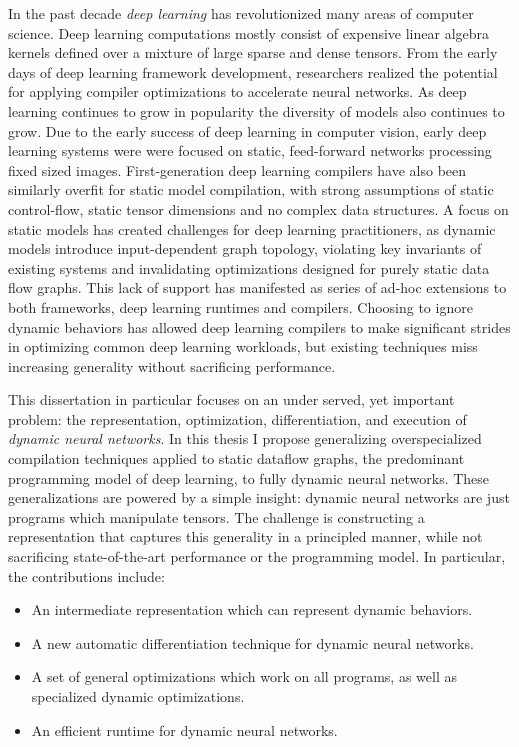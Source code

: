 \begin{fullwidth}
\begin{center}
\begin{flushleft}
In the past decade \emph{deep learning} has revolutionized many areas of
    computer science.
Deep learning computations mostly consist
    of expensive linear algebra kernels defined over a mixture
    of large sparse and dense tensors.
From the early days of deep learning framework development, researchers realized the
    potential for applying compiler optimizations to accelerate neural networks.
As deep learning continues to grow in popularity the diversity
    of models also continues to grow.
Due to the early success of deep learning in computer
    vision, early deep learning systems were were focused on static,
    feed-forward networks processing fixed sized images.
First-generation deep learning compilers have also been similarly overfit
    for static model compilation, with strong assumptions of static control-flow,
    static tensor dimensions and no complex data structures.
A focus on static models has created challenges for deep learning practitioners,
    as dynamic models introduce input-dependent graph topology,
    violating key invariants of existing systems and invalidating optimizations
    designed for purely static data flow graphs.
This lack of support has manifested as series of ad-hoc extensions to
  both frameworks, deep learning runtimes and compilers.
Choosing to ignore dynamic behaviors has allowed deep learning
    compilers to make significant strides in optimizing common
    deep learning workloads, but existing techniques miss
    increasing generality without sacrificing performance.

This dissertation in particular focuses on an under served, yet important problem:
  the representation,
  optimization,
  differentiation,
  and execution of \emph{dynamic neural networks}.
In this thesis I propose generalizing overspecialized
  compilation techniques applied to static dataflow graphs,
  the predominant programming model of deep learning,
  to fully dynamic neural networks.
These generalizations are powered by a simple insight:
  dynamic neural networks are just programs which manipulate tensors.
The challenge is constructing a representation that captures this generality
  in a principled manner, while not sacrificing state-of-the-art performance or the programming model.
In particular, the contributions include:
\begin{itemize}
    \item An intermediate representation which can represent dynamic behaviors.
    \item A new automatic differentiation technique for dynamic neural networks.
    \item A set of general optimizations which work on all programs, as well
          as specialized dynamic optimizations.
    \item An efficient runtime for dynamic neural networks.
\end{itemize}


\end{flushleft}
\end{center}
\end{fullwidth}
